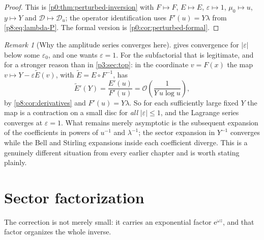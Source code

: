 \documentclass[11pt,a4paper,oneside]{book}
\theoremstyle{plain}
\theoremstyle{definition}
\theoremstyle{remark}
\newtheorem{remark}[theorem]{Remark}
\newcommand{\e}{\mathrm{e}}
\newcommand{\bigO}{\mathcal{O}}
\begin{document}
\begin{proof}
This is \cref{p0:thm:perturbed-inversion} with $F\mapsto F$, $E\mapsto E$,
$\varepsilon\mapsto1$, $\mu_0\mapsto u$, $y\mapsto Y$ and
$\mathcal{D}\mapsto\mathscr{D}_u$; the operator identification uses
$F'(u)=Y\lambda$ from \eqref{p8:eq:lambda-P}.  The formal version is
\cref{p0:cor:perturbed-formal}.
\end{proof}

\begin{remark}[Why the amplitude series converges here]
\label{p8:rem:convergence}
 gives convergence for $|\varepsilon|$ below
some $\varepsilon_0$, and one wants $\varepsilon=1$.  For the subfactorial
that is legitimate, and for a stronger reason than in \cref{p3:sec:top}: in
the coordinate $v=F(x)$ the map $v\mapsto Y-\varepsilon\widetilde E(v)$, with
$\widetilde E=E\circ F^{-1}$, has
\begin{equation}\label{p8:eq:contraction}
 \widetilde E'(Y)=\frac{E'(u)}{F'(u)}
 =\bigO\!\left(\frac1{Y\,u\log u}\right),
\end{equation}
by \cref{p8:cor:derivatives} and $F'(u)=Y\lambda$.  So for each sufficiently
large fixed $Y$ the map is a contraction on a small disc for \emph{all}
$|\varepsilon|\le1$, and the Lagrange series converges at $\varepsilon=1$.
What remains merely asymptotic is the subsequent expansion of the
coefficients in powers of $u^{-1}$ and $\lambda^{-1}$; the sector expansion in
$Y^{-1}$ converges while the Bell and Stirling expansions inside each
coefficient diverge.  This is a genuinely different situation from every
earlier chapter and is worth stating plainly.
\end{remark}

\section{Sector factorization}
\label{p8:sec:sectors}

The correction is not merely small: it carries an exponential factor
$\e^{\omega z}$, and that factor organizes the whole inverse.
\end{document}

